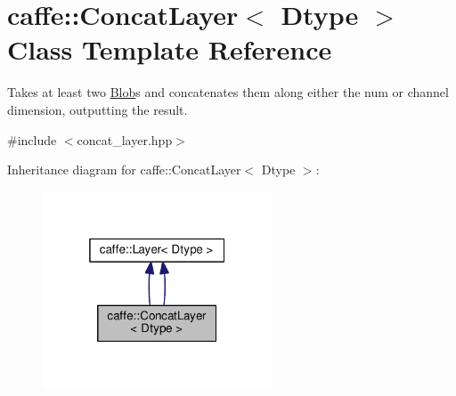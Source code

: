\hypertarget{classcaffe_1_1_concat_layer}{}\section{caffe\+:\+:Concat\+Layer$<$ Dtype $>$ Class Template Reference}
\label{classcaffe_1_1_concat_layer}


Takes at least two \mbox{\hyperlink{classcaffe_1_1_blob}{Blob}}s and concatenates them along either the num or channel dimension, outputting the result.  




{\ttfamily \#include $<$concat\+\_\+layer.\+hpp$>$}



Inheritance diagram for caffe\+:\+:Concat\+Layer$<$ Dtype $>$\+:
\nopagebreak
\begin{figure}[H]
\begin{center}
\leavevmode
\includegraphics[width=193pt]{classcaffe_1_1_concat_layer__inherit__graph}
\end{center}
\end{figure}
